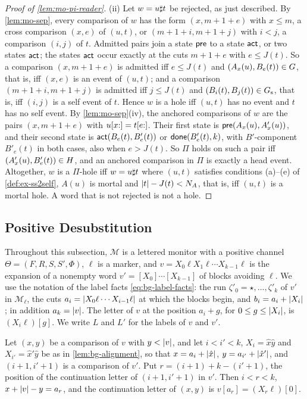 \begin{proof}[Proof of \cref{lem:mo-pi-reader}]
(ii) Let $w=u\sharp t$ be rejected, as just described. By \cref{lem:mo-sep}, every
comparison of $w$ has the form $(x,m+1+e)$ with $x\le m$, a cross comparison
$(x,e)$ of $(u,t)$, or $(m+1+i,m+1+j)$ with $i<j$, a comparison $(i,j)$ of
$t$. Admitted pairs join a state $\mathsf{pre}$ to a state $\mathsf{act}$, or two states
$\mathsf{act}$; the states $\mathsf{act}$ occur exactly at the cuts $m+1+e$ with $e\le J(t)$.
So a comparison $(x,m+1+e)$ is admitted iff $e\le J(t)$ and
$(A_x(u),B_e(t))\in G$, that is, iff $(x,e)$ is an event of $(u,t)$; and a
comparison $(m+1+i,m+1+j)$ is admitted iff $j\le J(t)$ and
$(B_i(t),B_j(t))\in G_{\mathrm{s}}$, that is, iff $(i,j)$ is a self event of $t$. Hence
$w$ is a hole iff $(u,t)$ has no event and $t$ has no self event. By
\cref{lem:mo-sep}(iv), the anchored comparisons of $w$ are the pairs
$(x,m+1+e)$ with $u[x{:}]=t[e{:}]$. Their first state is
$\mathsf{pre}(A_x(u),A'_x(u))$, and their second state is $\mathsf{act}(B_e(t),B'_e(t))$ or
$\mathsf{done}(B'_e(t),k)$, with $B'$-component $B'_e(t)$ in both cases, also when
$e>J(t)$. So $\Pi$ holds on such a pair iff $(A'_x(u),B'_e(t))\in H$, and an
anchored comparison in $\Pi$ is exactly a head event. Altogether, $w$ is a
$\Pi$-hole iff $w=u\sharp t$ where $(u,t)$ satisfies conditions (a)--(e) of
\cref{def:ex-ss2self}, $A(u)$ is mortal and $\lvert t\rvert-J(t)<N_A$, that is, iff
$(u,t)$ is a mortal hole. A word that is not rejected is not a hole.
\end{proof}

\subsection{Positive Desubstitution}\label{app:mo-desub}

Throughout this subsection, $\mathcal M$ is a lettered monitor with a positive
channel $\Theta=(F,R,S,S',\Phi)$, $\ell$ is a marker, and
$v=X_0\ell X_1\ell\cdots X_{k-1}\ell$ is the expansion of a nonempty word
$v'=[X_0]\cdots[X_{k-1}]$ of blocks avoiding $\ell$. We use the notation of the
label facts \cref{eq:bg-label-facts}: the run $\zeta'_0=\star,\ldots,\zeta'_k$
of $v'$ in $\mathcal M_\ell$, the cuts $a_i=\lvert X_0\ell\cdots X_{i-1}\ell\rvert$ at
which the blocks begin, and $b_i=a_i+\lvert X_i\rvert$; in addition $a_k=\lvert v\rvert$. The
letter of $v$ at the position $a_i+g$, for $0\le g\le\lvert X_i\rvert$, is
$(X_i\ell)[g]$. We write $L$ and $L'$ for the labels of $v$ and $v'$.

\begin{lemma}\label{lem:mo-transport}
Let $(x,y)$ be a comparison of $v$ with $y<\lvert v\rvert$, and let $i<i'<k$,
$X_i=\hat x\hat y$ and $X_{i'}=\hat x'\hat y$ be as in \cref{lem:bg-alignment},
so that $x=a_i+\lvert \hat x\rvert$, $y=a_{i'}+\lvert \hat x'\rvert$, and $(i+1,i'+1)$ is a
comparison of $v'$. Put $r=(i+1)+k-(i'+1)$, the position of the continuation
letter of $(i+1,i'+1)$ in $v'$. Then $i<r<k$, $x+\lvert v\rvert-y=a_r$, and the
continuation letter of $(x,y)$ is $v[a_r]=(X_r\ell)[0]$.
\end{lemma}

